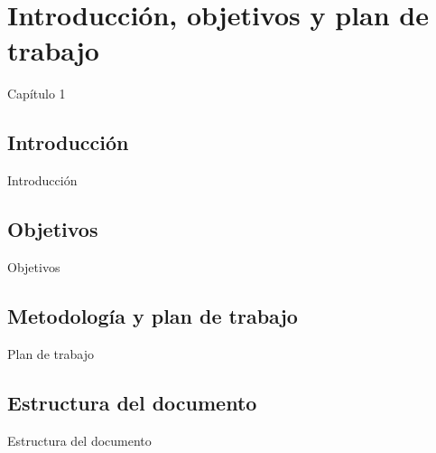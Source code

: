 \chapter{Introducción, objetivos y plan de trabajo}
Capítulo 1

\section{Introducción}
Introducción

\section{Objetivos}
Objetivos

\section{Metodología y plan de trabajo}
Plan de trabajo

\section{Estructura del documento}
Estructura del documento